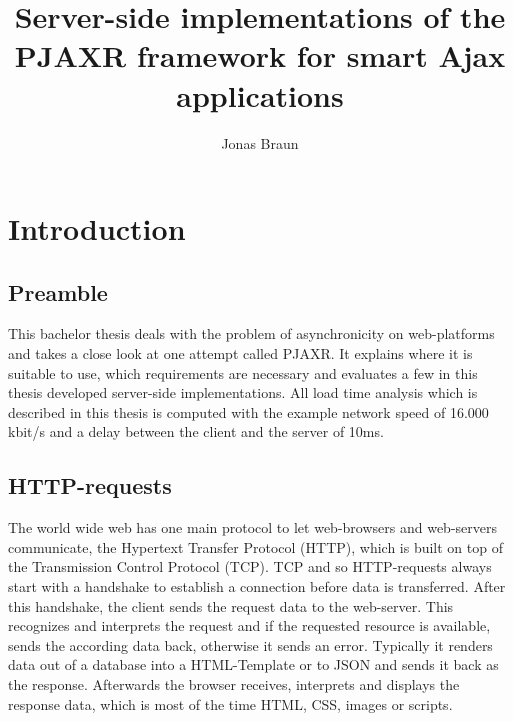 \documentclass[f,bachelor,binding,twoside,palatino]{WeSTthesis}
\author{Jonas Braun}
\title{Server-side implementations of the PJAXR framework for smart Ajax applications}
\def \pjaxr {PJAXR}
\def \httpRequests {HTTP-requests}
\begin{document}

\maketitle %

\tableofcontents

\varclearpage



\section{Introduction}
  \subsection{Preamble}
  This bachelor thesis deals with the problem of asynchronicity on web-platforms and takes a close look at one attempt called \pjaxr{}. It explains where it is suitable to use, which requirements are necessary and evaluates a few in this thesis developed server-side implementations.
  All load time analysis which is described in this thesis is computed with the example network speed of 16.000 kbit/s and a delay between the client and the server of 10ms.
  

  \subsection{\httpRequests{}}
    The world wide web has one main protocol to let web-browsers and web-servers communicate, the Hypertext Transfer Protocol (HTTP), which is built on top of the Transmission Control Protocol (TCP).
    TCP and so \httpRequests{} always start with a handshake to establish a connection before data is transferred.
    After this handshake, the client sends the request data to the web-server.
    This recognizes and interprets the request and if the requested resource is available, sends the according data back, otherwise it sends an error.
    Typically it renders data out of a database into a HTML-Template or to JSON and sends it back as the response.
	Afterwards the browser receives, interprets and displays the response data, which is most of the time HTML, CSS, images or scripts.
\end{document}
